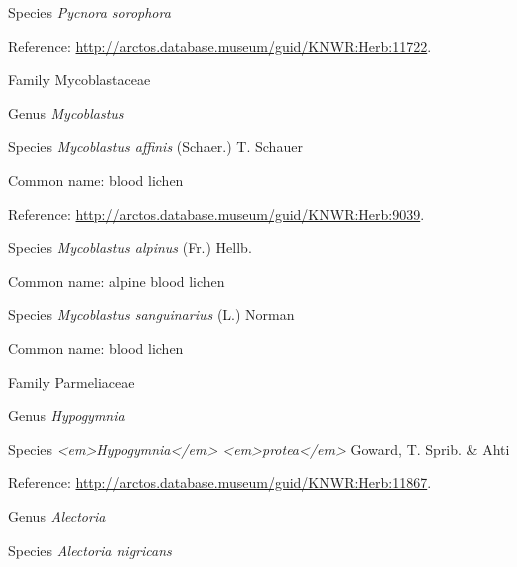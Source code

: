 \documentclass[9pt, article]{memoir}
\begin{document}
\begin{multicols}{2}
\vspace{6pt}\noindent\hspace{36pt}Species \textit{Pycnora sorophora}


Reference: 
\url{http://arctos.database.museum/guid/KNWR:Herb:11722}.

\vspace{6pt}\noindent\hspace{24pt}Family Mycoblastaceae


\vspace{6pt}\noindent\hspace{30pt}Genus \textit{Mycoblastus}


\vspace{6pt}\noindent\hspace{36pt}Species \textit{Mycoblastus affinis} (Schaer.) T. Schauer


Common name: blood lichen

Reference: 
\url{http://arctos.database.museum/guid/KNWR:Herb:9039}.

\vspace{6pt}\noindent\hspace{36pt}Species \textit{Mycoblastus alpinus} (Fr.) Hellb.


Common name: alpine blood lichen

\vspace{6pt}\noindent\hspace{36pt}Species \textit{Mycoblastus sanguinarius} (L.) Norman


Common name: blood lichen

\vspace{6pt}\noindent\hspace{24pt}Family Parmeliaceae


\vspace{6pt}\noindent\hspace{30pt}Genus \textit{Hypogymnia}


\vspace{6pt}\noindent\hspace{36pt}Species \textit{<em>Hypogymnia</em> <em>protea</em>} Goward, T. Sprib. \& Ahti


Reference: 
\url{http://arctos.database.museum/guid/KNWR:Herb:11867}.

\vspace{6pt}\noindent\hspace{30pt}Genus \textit{Alectoria}


\vspace{6pt}\noindent\hspace{36pt}Species \textit{Alectoria nigricans}



\end{multicols}
\end{document}
